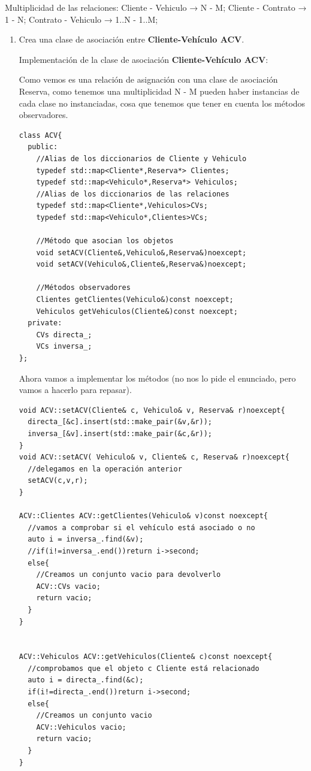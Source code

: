 Multiplicidad de las relaciones:
Cliente - Vehiculo → N - M; Cliente - Contrato → 1 - N; Contrato - Vehiculo → 1..N - 1..M;
\newpage
\begin{enumerate}[label =\alph*)]
  \item Crea una clase de asociación entre \textbf{Cliente-Vehículo ACV}.

  Implementación de la clase de asociación  \textbf{Cliente-Vehículo ACV}:

  Como vemos es una relación de asignación con una clase de asociación Reserva, como tenemos una multiplicidad N - M pueden haber instancias de cada clase no instanciadas, cosa que tenemos que tener en cuenta los métodos observadores.
\begin{verbatim}
class ACV{
  public:
    //Alias de los diccionarios de Cliente y Vehiculo
    typedef std::map<Cliente*,Reserva*> Clientes;
    typedef std::map<Vehiculo*,Reserva*> Vehiculos;
    //Alias de los diccionarios de las relaciones
    typedef std::map<Cliente*,Vehiculos>CVs;
    typedef std::map<Vehiculo*,Clientes>VCs;

    //Método que asocian los objetos
    void setACV(Cliente&,Vehiculo&,Reserva&)noexcept;
    void setACV(Vehiculo&,Cliente&,Reserva&)noexcept;

    //Métodos observadores
    Clientes getClientes(Vehiculo&)const noexcept;
    Vehiculos getVehiculos(Cliente&)const noexcept;
  private:
    CVs directa_;
    VCs inversa_;
};
\end{verbatim}
Ahora vamos a implementar los métodos (no nos lo pide el enunciado, pero vamos a hacerlo para repasar).
\begin{verbatim}
void ACV::setACV(Cliente& c, Vehiculo& v, Reserva& r)noexcept{
  directa_[&c].insert(std::make_pair(&v,&r));
  inversa_[&v].insert(std::make_pair(&c,&r));
}
void ACV::setACV( Vehiculo& v, Cliente& c, Reserva& r)noexcept{
  //delegamos en la operación anterior
  setACV(c,v,r);
}

ACV::Clientes ACV::getClientes(Vehiculo& v)const noexcept{
  //vamos a comprobar si el vehículo está asociado o no
  auto i = inversa_.find(&v);
  //if(i!=inversa_.end())return i->second;
  else{
    //Creamos un conjunto vacio para devolverlo
    ACV::CVs vacio;
    return vacio;
  }
}


ACV::Vehiculos ACV::getVehiculos(Cliente& c)const noexcept{
  //comprobamos que el objeto c Cliente está relacionado
  auto i = directa_.find(&c);
  if(i!=directa_.end())return i->second;
  else{
    //Creamos un conjunto vacio
    ACV::Vehiculos vacio;
    return vacio;
  }
}
\end{verbatim}


\end{enumerate}
